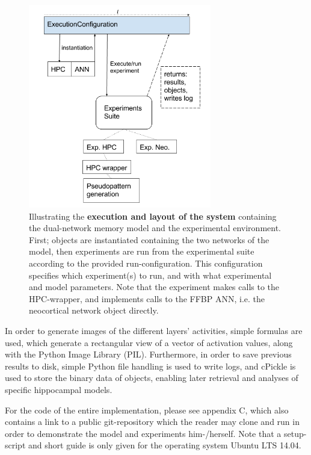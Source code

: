 \begin{figure}
    \centering
    \includegraphics[width=8cm]{fig/ExecutionConfiguration.png}
    \caption{Illustrating the \textbf{execution and layout of the system} containing the dual-network memory model and the experimental environment. First; objects are instantiated containing the two networks of the model, then experiments are run from the experimental suite according to the provided run-configuration. This configuration specifies which experiment(s) to run, and with what experimental and model parameters. Note that the experiment makes calls to the HPC-wrapper, and implements calls to the FFBP ANN, i.e. the neocortical network object directly.}
    \label{fig:system_layout}
\end{figure}

In order to generate images of the different layers' activities, simple formulas are used, which generate a rectangular view of a vector of activation values, along with the Python Image Library (PIL). Furthermore, in order to save previous results to disk, simple Python file handling is used to write logs, and cPickle is used to store the binary data of objects, enabling later retrieval and analyses of specific hippocampal models.

For the code of the entire implementation, please see appendix C, which also contains a link to a public git-repository which the reader may clone and run in order to demonstrate the model and experiments him-/herself. Note that a setup-script and short guide is only given for the operating system Ubuntu LTS 14.04.




